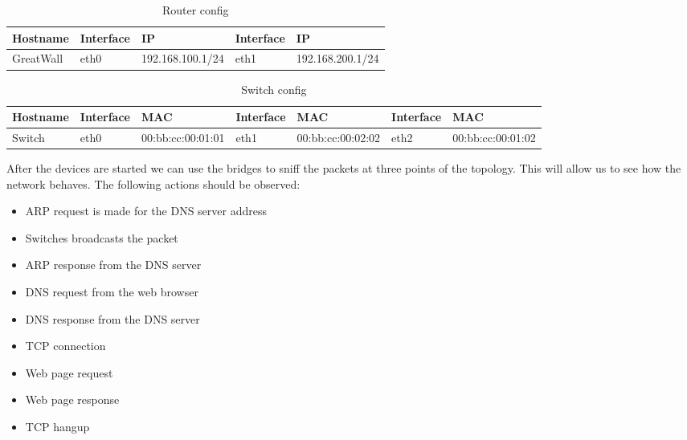 \begin{center}
  \begin{table}[htb]
  \begin{center}
  \begin{tabular}{| l | l | l | l | l |}
    \hline
      Hostname & Interface & IP & Interface & IP \\ \hline
      GreatWall & eth0 & 192.168.100.1/24 & eth1 & 192.168.200.1/24 \\ 
    \hline
  \end{tabular}
  \end{center}
  \caption{Router config}
  \label{table:complex-router}
  \end{table}
\end{center}

\begin{center}
  \begin{table}[htb]
  \begin{center}
  \begin{tabular}{| l | l | l | l | l | l | l |}
    \hline
      Hostname & Interface & MAC & Interface & MAC & Interface & MAC \\ \hline
      Switch & eth0 & 00:bb:cc:00:01:01 & eth1 & 00:bb:cc:00:02:02 & eth2 & 00:bb:cc:00:01:02 \\
    \hline
  \end{tabular}
  \end{center}
  \caption{Switch config}
  \label{table:complex-switch}
  \end{table}
\end{center}

After the devices are started we can use the bridges to sniff the packets at three points of the topology.
This will allow us to see how the network behaves. The following actions should be observed:
\begin{itemize}
	\item ARP request is made for the DNS server address
	\item Switches broadcasts the packet
	\item ARP response from the DNS server
	\item DNS request from the web browser
	\item DNS response from the DNS server
	\item TCP connection
	\item Web page request
	\item Web page response
	\item TCP hangup
\end{itemize}

